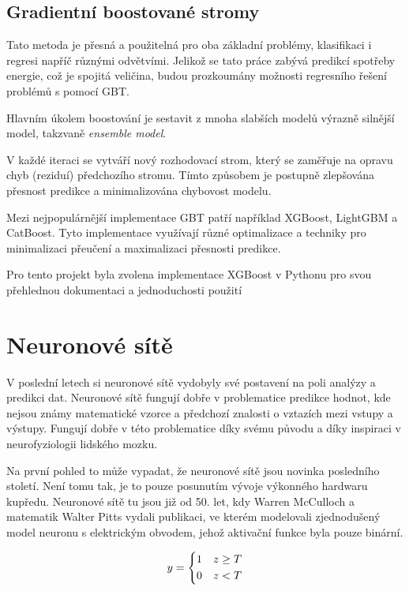 \documentclass[FM,BP,fonts]{tulthesis}
\begin{document}
\subsection{Gradientní boostované stromy}
Tato metoda je přesná a použitelná pro oba základní problémy, klasifikaci i regresi napříč různými odvětvími. Jelikož se tato práce zabývá predikcí spotřeby energie, což je spojitá veličina, budou prozkoumány možnosti regresního řešení problémů s pomocí GBT.

Hlavním úkolem boostování je sestavit z mnoha slabších modelů výrazně silnější model, takzvaně \textit{ensemble  model}. \cite{chen2016xgboost}

V každé iteraci se vytváří nový rozhodovací strom, který se zaměřuje na opravu chyb (reziduí) předchozího stromu. Tímto způsobem je postupně zlepšována přesnost predikce a minimalizována chybovost modelu. 

Mezi nejpopulárnější implementace GBT patří například XGBoost, LightGBM a CatBoost. Tyto implementace využívají různé optimalizace a techniky pro minimalizaci přeučení a maximalizaci přesnosti predikce.

Pro tento projekt byla zvolena implementace XGBoost v Pythonu pro svou přehlednou dokumentaci a jednoduchosti použití


\section{Neuronové sítě}
V poslední letech si neuronové sítě vydobyly své postavení na poli analýzy a predikci dat. Neuronové sítě fungují dobře v problematice predikce hodnot, kde nejsou známy matematické vzorce a předchozí znalosti o vztazích mezi vstupy a výstupy. Fungují dobře v této problematice díky svému původu a díky inspiraci v neurofyziologii lidského mozku.

Na první pohled to může vypadat, že neuronové sítě jsou novinka posledního století. Není tomu tak, je to pouze posunutím vývoje výkonného hardwaru kupředu. Neuronové sítě tu jsou již od 50. let, kdy Warren McCulloch a matematik Walter Pitts vydali publikaci, ve kterém modelovali zjednodušený model neuronu s elektrickým obvodem, jehož aktivační funkce byla pouze binární. \cite{mcculloch1943logical}

\begin{equation}
	y = \begin{dcases}
		1 & z \geq T \\
		0 & z < T
	\end{dcases}
\end{equation}
\end{document}
